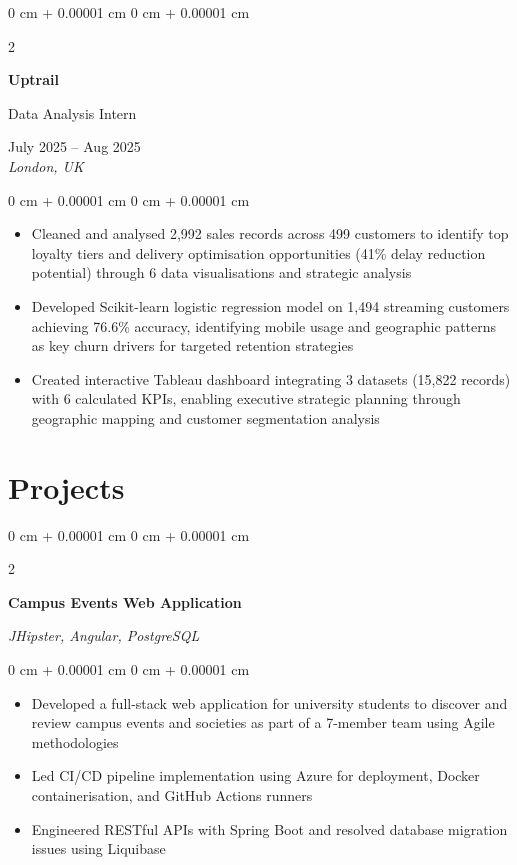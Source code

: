 \documentclass[10pt, a4paper]{article}
\newenvironment{highlights}{
    \begin{itemize}[
        topsep=0.10 cm,
        parsep=0.10 cm,
        partopsep=0pt,
        itemsep=0pt,
        leftmargin=20pt
    ]
}{
    \end{itemize}
} %
\newenvironment{onecolentry}{
    \begin{adjustwidth}{
        0 cm + 0.00001 cm
    }{
        0 cm + 0.00001 cm
    }
}{
    \end{adjustwidth}
} %
\newenvironment{twocolentry}[2][]{
    \onecolentry
    \def\secondColumn{#2}
    \setcolumnwidth{\fill, 4.5 cm}
    \begin{paracol}{2}
}{
    \switchcolumn \raggedleft \secondColumn
    \end{paracol}
    \endonecolentry
} %
\begin{document}
    \vspace{0.15 cm}

    \begin{twocolentry}{
        July 2025 -- Aug 2025 \\
        \textit{London, UK}
    }
        \textbf{Uptrail}
        
        Data Analysis Intern
    \end{twocolentry}

    \vspace{0.10 cm}
    \begin{onecolentry}
        \begin{highlights}
            \item Cleaned and analysed 2,992 sales records across 499 customers to identify top loyalty tiers and delivery optimisation opportunities (41\% delay reduction potential) through 6 data visualisations and strategic analysis
            \item Developed Scikit-learn logistic regression model on 1,494 streaming customers achieving 76.6\% accuracy, identifying mobile usage and geographic patterns as key churn drivers for targeted retention strategies
            \item Created interactive Tableau dashboard integrating 3 datasets (15,822 records) with 6 calculated KPIs, enabling executive strategic planning through geographic mapping and customer segmentation analysis
        \end{highlights}
    \end{onecolentry}

    \vspace{0.15 cm}

    \section{Projects}


    \begin{twocolentry}{
        \textit{JHipster, Angular, PostgreSQL}
    }
        \textbf{Campus Events Web Application}
    \end{twocolentry}

    \vspace{0.10 cm}
    \begin{onecolentry}
        \begin{highlights}
            \item Developed a full-stack web application for university students to discover and review campus events and societies as part of a 7-member team using Agile methodologies
            \item Led CI/CD pipeline implementation using Azure for deployment, Docker containerisation, and GitHub Actions runners
            \item Engineered RESTful APIs with Spring Boot and resolved database migration issues using Liquibase
        \end{highlights}
    \end{onecolentry}
\end{document}
